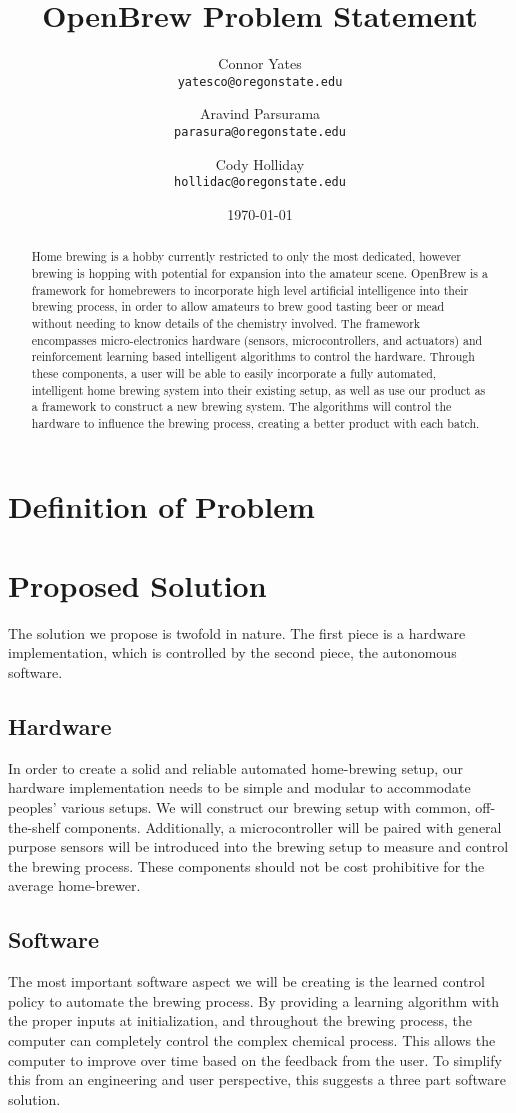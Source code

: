 \documentclass[letterpaper,10pt]{article}
\author{Connor Yates\\
\texttt{yatesco@oregonstate.edu}
\and
Aravind Parsurama\\
\texttt{parasura@oregonstate.edu}
\and
Cody Holliday\\
\texttt{hollidac@oregonstate.edu}}
\date{\today}
\title{OpenBrew Problem Statement}
\begin{document}
\maketitle

\begin{abstract}
Home brewing is a hobby currently restricted to only the most dedicated, however 
brewing is hopping with potential for expansion into the amateur scene. OpenBrew 
is a framework for homebrewers to incorporate high level artificial intelligence 
into their brewing process, in order to allow amateurs to brew good tasting beer 
or mead without needing to know details of the chemistry involved. The framework 
encompasses micro-electronics hardware (sensors, microcontrollers, and actuators) 
and reinforcement learning based intelligent algorithms to control the hardware. 
Through these components, a user will be able to easily incorporate a fully automated, 
intelligent home brewing system into their existing setup, as well as use our product 
as a framework to construct a new brewing system. The algorithms will control the 
hardware to influence the brewing process, creating a better product with each batch.
\end{abstract}

\newpage

\section{Definition of Problem}

\section{Proposed Solution}
The solution we propose is twofold in nature.
The first piece is a hardware implementation, which is controlled by the second piece, the autonomous software.
\subsection{Hardware}
In order to create a solid and reliable automated home-brewing setup, our hardware implementation needs to be simple and modular to accommodate peoples' various setups.
We will construct our brewing setup with common, off-the-shelf components.
Additionally, a microcontroller will be paired with general purpose sensors will be introduced into the brewing setup to measure and control the brewing process.
These components should not be cost prohibitive for the average home-brewer.
\subsection{Software}
The most important software aspect we will be creating is the learned control policy to automate the brewing process. 
By providing a learning algorithm with the proper inputs at initialization, and throughout the brewing process, the computer can completely control the complex chemical process.
This allows the computer to improve over time based on the feedback from the user.
To simplify this from an engineering and user perspective, this suggests a three part software solution.
\end{document}
